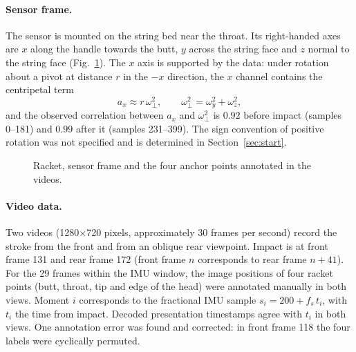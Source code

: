 \documentclass[11pt,a4paper]{article}
\begin{document}
\paragraph{Sensor frame.} The sensor is mounted on the string bed near the throat. Its
right-handed axes are $x$ along the handle towards the butt, $y$ across the string face and $z$
normal to the string face (Fig.~\ref{fig:frame}). The $x$ axis is supported by the data: under
rotation about a pivot at distance $r$ in the $-x$ direction, the $x$ channel contains the
centripetal term
\begin{equation}
a_x \approx r\,\omega_\perp^2,\qquad \omega_\perp^2=\omega_y^2+\omega_z^2 ,
\label{eq:centripetal}
\end{equation}
and the observed correlation between $a_x$ and $\omega_\perp^2$ is $0.92$ before impact (samples
0--181) and $0.99$ after it (samples 231--399). The sign convention of positive rotation was not
specified and is determined in Section~\ref{sec:start}.

\begin{figure}[H]\centering
{}
\caption{Racket, sensor frame and the four anchor points annotated in the videos.}
\label{fig:frame}
\end{figure}

\paragraph{Video data.} Two videos (1280$\times$720 pixels, approximately 30 frames per second)
record the stroke from the front and from an oblique rear viewpoint. Impact is at front frame 131
and rear frame 172 (front frame $n$ corresponds to rear frame $n+41$). For the 29 frames within the
IMU window, the image positions of four racket points (butt, throat, tip and edge of the head) were
annotated manually in both views. Moment $i$ corresponds to the fractional IMU sample
$s_i=200+f_s\,t_i$, with $t_i$ the time from impact. Decoded presentation timestamps agree with
$t_i$ in both views. One annotation error was found and corrected: in front frame 118 the four
labels were cyclically permuted.
\end{document}

